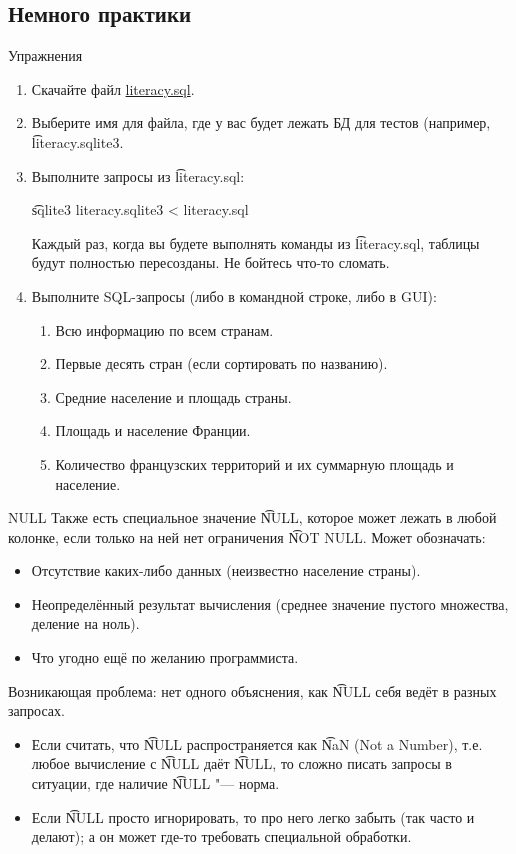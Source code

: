 \subsection{Немного практики}

\begin{frame}{Упражнения}
	\begin{enumerate}
		\item Скачайте файл \href{https://www.dropbox.com/s/jo26qgwysxsb8aj/literacy.sql?dl=0}{literacy.sql}.
		\item Выберите имя для файла, где у вас будет лежать БД для тестов (например, \t{literacy.sqlite3}.
		\item Выполните запросы из \t{literacy.sql}:
			\begin{center}
				\t{sqlite3 literacy.sqlite3 < literacy.sql}
			\end{center}
			Каждый раз, когда вы будете выполнять команды из \t{literacy.sql}, таблицы
			будут полностью пересозданы.
			Не бойтесь что-то сломать.
		\item
		     Выполните SQL-запросы (либо в командной строке, либо в GUI):
		     \begin{enumerate}
		     	\item Всю информацию по всем странам.
		     	\item Первые десять стран (если сортировать по названию).
		     	\item Средние население и площадь страны.
		     	\item Площадь и население Франции.
		     	\item Количество французских территорий и их суммарную площадь и население.
		     \end{enumerate}
	\end{enumerate}
\end{frame}

\begin{frame}{NULL}
	Также есть специальное значение \t{NULL}, которое может лежать в любой колонке, если только на ней нет ограничения \t{NOT NULL}.
	Может обозначать:
	\begin{itemize}
		\item Отсутствие каких-либо данных (неизвестно население страны).
		\item Неопределённый результат вычисления (среднее значение пустого множества, деление на ноль).
		\item Что угодно ещё по желанию программиста.
	\end{itemize}
	Возникающая проблема: нет одного объяснения, как \t{NULL} себя ведёт в разных запросах.
	\begin{itemize}
		\item
			Если считать, что \t{NULL} распространяется как \t{NaN} (Not a Number), т.е. любое вычисление с \t{NULL} даёт \t{NULL},
			то сложно писать запросы в ситуации, где наличие \t{NULL} "--- норма.
		\item
			Если \t{NULL} просто игнорировать, то про него легко забыть (так часто и делают); а он может где-то требовать специальной обработки.
	\end{itemize}
\end{frame}

